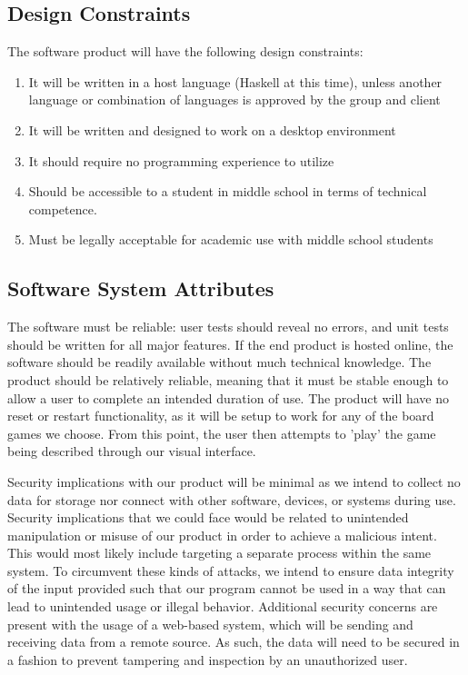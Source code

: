 \documentclass[10pt,letter,draftclsnofoot,onecolumn]{IEEEtran}
\begin{document}
\begin{singlespace}
    \subsection{Design Constraints}
        The software product will have the following design constraints:
        \begin{enumerate}
            \item It will be written in a host language (Haskell at this time), unless another language or combination of languages is approved by the group and client
            \item It will be written and designed to work on a desktop environment
            \item It should require no programming experience to utilize
            \item Should be accessible to a student in middle school in terms of technical competence.
            \item Must be legally acceptable for academic use with middle school students
        \end{enumerate}
    \subsection{Software System Attributes}
        The software must be reliable: user tests should reveal no errors, and unit tests should be written for all major features. If the end product is hosted online, the software should be readily available without much technical knowledge. The product should be relatively reliable, meaning that it must be stable enough to allow a user to complete an intended duration of use. The product will have no reset or restart functionality, as it will be setup to work for any of the board games we choose. From this point, the user then attempts to 'play' the game being described through our visual interface.
        
        
        Security implications with our product will be minimal as we intend to collect no data for storage nor connect with other software, devices, or systems during use. Security implications that we could face would be related to unintended manipulation or misuse of our product in order to achieve a malicious intent. This would most likely include targeting a separate process within the same system. To circumvent these kinds of attacks, we intend to ensure data integrity of the input provided such that our program cannot be used in a way that can lead to unintended usage or illegal behavior. Additional security concerns are present with the usage of a web-based system, which will be sending and receiving data from a remote source. As such, the data will need to be secured in a fashion to prevent tampering and inspection by an unauthorized user.
        

\end{singlespace}
\end{document}

